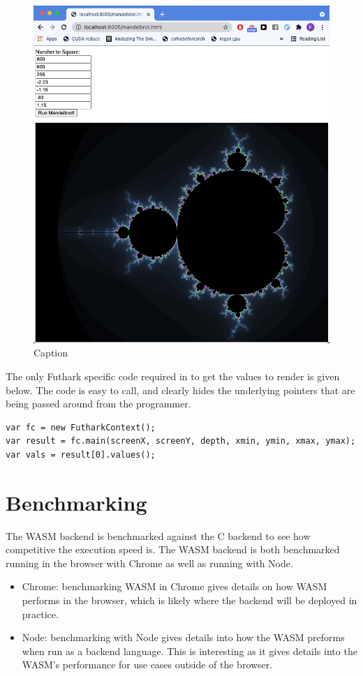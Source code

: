 \documentclass[11pt]{book}
\begin{document}
\begin{figure}[htbp]
    \centering
    \includegraphics[scale=0.3]{figures/mandelbrot.png}
    \caption{Caption}
    \label{fig:mandelbrot}
\end{figure}

The only Futhark specific code required in to get the values to render is given below. The code is easy to call, and clearly hides the underlying pointers that are being passed around from the programmer.

\begin{verbatim}
var fc = new FutharkContext();
var result = fc.main(screenX, screenY, depth, xmin, ymin, xmax, ymax);
var vals = result[0].values();
\end{verbatim}

\section{Benchmarking}

The WASM backend is benchmarked against the C backend to see how competitive the execution speed is. The WASM backend is both benchmarked running in the browser with Chrome as well as running with Node. 
\begin{itemize}
    \item Chrome: benchmarking WASM in Chrome gives details on how WASM performs in the browser, which is likely where the backend will be deployed in practice.
    \item Node: benchmarking with Node gives details into how the WASM preforms when run as a backend language. This is interesting as it gives details into the WASM's performance for use cases outside of the browser.
\end{itemize}
\end{document}
